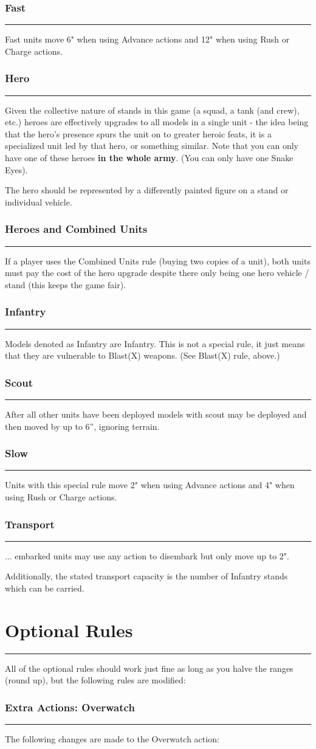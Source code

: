 \documentclass[11pt]{article}
\newcommand{\mysection}[1]{
  \section*{\centering #1}
  \raggedright
  \hrule
  \bigskip

}
\newcommand{\myheading}[1]{
  \subsubsection*{\centering #1}
  \raggedright
  \hrule
}
\begin{document}
\begin{multicols*}{3}[]
\myheading{Fast}

Fast units move 6" when using Advance actions and 12" when using Rush or Charge
actions.

\myheading{Hero}

Given the collective nature of stands in this game (a squad, a tank (and crew),
etc.) heroes are effectively upgrades to all models in a single unit - the idea
being that the hero's presence spurs the unit on to greater heroic feats, it is
a specialized unit led by that hero, or something similar. Note that you can
only have one of these heroes {\bf in the whole army}. (You can only have one
Snake Eyes).

The hero should be represented by a differently painted figure on a stand or
individual vehicle.

\myheading{Heroes and Combined Units}

If a player uses the Combined Units rule (buying two copies of a unit), both
units must pay the cost of the hero upgrade despite there only being one hero
vehicle / stand (this keeps the game fair).

\myheading{Infantry}

Models denoted as Infantry are Infantry. This is not a special rule, it just
means that they are vulnerable to Blast(X) weapons. (See Blast(X) rule, above.)

\myheading{Scout}

After all other units have been deployed models with scout may be deployed and
then moved by up to 6”, ignoring terrain.

\myheading{Slow}

Units with this special rule move 2" when using Advance actions and 4" when
using Rush or Charge actions.

\myheading{Transport}

... embarked units may use any action to disembark but only move up to 2".

Additionally, the stated transport capacity is the number of Infantry stands which can be carried.

\newpage

\mysection{Optional Rules}

All of the optional rules should work just fine as long as you halve the ranges
(round up), but the following rules are modified:

\myheading{Extra Actions: Overwatch}

The following changes are made to the Overwatch action:


\end{multicols*}
\end{document}
